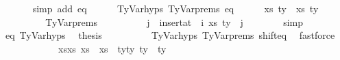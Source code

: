 \begin{isabellebody}
\ \ \ \ \ \isamarkupfalse%
\ {\isacharparenleft}{\kern0pt}simp\ add{\isacharcolon}{\kern0pt}\ eq{\isacharparenright}{\kern0pt}\isanewline
\isanewline
\ \ \ \ \isamarkupfalse%
\ TyVar{\isachardot}{\kern0pt}hyps{\isacharparenleft}{\kern0pt}{}{\isacharparenright}{\kern0pt}\ TyVar{\isachardot}{\kern0pt}prems{\isacharparenleft}{\kern0pt}{}{\isacharparenright}{\kern0pt}\ eq\isanewline
\ \ \ \ \isamarkupfalse%
\ {\isachardoublequoteopen}{\isacharparenleft}{\kern0pt}xs{\isacharprime}{\kern0pt}{\isacharcomma}{\kern0pt}\ ty{\isacharprime}{\kern0pt}{\isacharparenright}{\kern0pt}\ {\isacharequal}{\kern0pt}\ {\isacharparenleft}{\kern0pt}xs{\isacharcomma}{\kern0pt}\ ty{}{\isacharparenright}{\kern0pt}{\isachardoublequoteclose}\isanewline
\ \ \ \ \isamarkupfalse%
\ {\isacharminus}{\kern0pt}\isanewline
\ \ \ \ \ \ \isamarkupfalse%
\ TyVar{\isachardot}{\kern0pt}prems{\isacharparenleft}{\kern0pt}{}{\isacharparenright}{\kern0pt}\isanewline
\ \ \ \ \ \ \isamarkupfalse%
\ {\isachardoublequoteopen}{\isasymGamma}\ {\isacharbang}{\kern0pt}\ j\ {\isacharequal}{\kern0pt}\ {\isacharparenleft}{\kern0pt}insert{\isacharunderscore}{\kern0pt}at\ {\isasymGamma}{}\ i\ {\isacharparenleft}{\kern0pt}xs{\isacharcomma}{\kern0pt}\ ty{}{\isacharparenright}{\kern0pt}{\isacharparenright}{\kern0pt}\ {\isacharbang}{\kern0pt}\ j{\isachardoublequoteclose}\isanewline
\ \ \ \ \ \ \isamarkupfalse%
\ simp\isanewline
\ \ \ \ \ \ \isamarkupfalse%
\ eq\ TyVar{\isachardot}{\kern0pt}hyps{\isacharparenleft}{\kern0pt}{}{\isacharparenright}{\kern0pt}\ \isamarkupfalse%
\ {\isacharquery}{\kern0pt}thesis\isanewline
\ \ \ \ \ \ \ \ \isamarkupfalse%
\ TyVar{\isachardot}{\kern0pt}hyps{\isacharparenleft}{\kern0pt}{}{\isacharparenright}{\kern0pt}\ TyVar{\isachardot}{\kern0pt}prems{\isacharparenleft}{\kern0pt}{}{\isacharparenright}{\kern0pt}\ shift{\isacharunderscore}{\kern0pt}eq\ \isamarkupfalse%
\ fastforce\isanewline
\ \ \ \ \isamarkupfalse%
\isanewline
\ \ \ \ \isamarkupfalse%
\ \isamarkupfalse%
\ xs{\isacharprime}{\kern0pt}{\isacharunderscore}{\kern0pt}xs{\isacharcolon}{\kern0pt}\ {\isachardoublequoteopen}xs{\isacharprime}{\kern0pt}\ {\isacharequal}{\kern0pt}\ xs{\isachardoublequoteclose}\ \ ty{\isacharprime}{\kern0pt}{\isacharunderscore}{\kern0pt}ty{}{\isacharcolon}{\kern0pt}\ {\isachardoublequoteopen}ty{\isacharprime}{\kern0pt}\ {\isacharequal}{\kern0pt}\ ty{}{\isachardoublequoteclose}\isanewline

\end{isabellebody}
